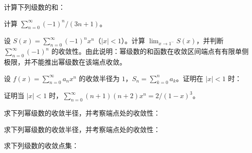 \newpage
\noindent\begin{minipage}{\textwidth}
计算下列级数的和：
\end{minipage}\par\vfill
\noindent\begin{minipage}{\textwidth}
计算 $\sum_{n=0}^{\infty}(-1)^n/(3n+1)$。
\end{minipage}\par\vfill
\noindent\begin{minipage}{\textwidth}
设 $S(x)=\sum_{n=0}^{\infty}(-1)^nx^n$（$|x|<1$）。计算 $\lim_{x\to1^-}S(x)$，并判断 $\sum_{n=0}^{\infty}(-1)^n$ 的收敛性。由此说明：幂级数的和函数在收敛区间端点有有限单侧极限，并不能推出幂级数在该端点收敛。
\end{minipage}\par\vfill
\newpage
\noindent\begin{minipage}{\textwidth}
设 $f(x)=\sum_{n=0}^{\infty}a_nx^n$ 的收敛半径为 $1$，$S_n=\sum_{k=0}^na_k$。证明在 $|x|<1$ 时：
\end{minipage}\par\vfill
\noindent\begin{minipage}{\textwidth}
证明当 $|x|<1$ 时，$\sum_{n=0}^{\infty}(n+1)(n+2)x^n=2/(1-x)^3$。
\end{minipage}\par\vfill
\noindent\begin{minipage}{\textwidth}
求下列幂级数的收敛半径，并考察端点处的收敛性：
\end{minipage}\par\vfill
\newpage
\noindent\begin{minipage}{\textwidth}
求下列幂级数的收敛半径，并考察端点处的收敛性：
\end{minipage}\par\vfill
\noindent\begin{minipage}{\textwidth}
求下列级数的收敛点集：
\end{minipage}\par\vfill
